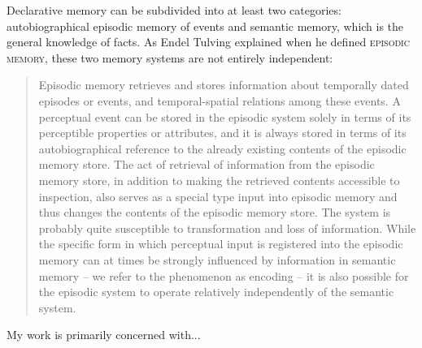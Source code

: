 Declarative memory can be subdivided into at least two categories: autobiographical episodic memory of events and semantic memory, which is the general knowledge of facts.
As Endel Tulving explained when he defined \textsc{episodic memory}, these two memory systems are not entirely independent:


\begin{quote}
Episodic memory retrieves and stores information about temporally dated episodes or events, and temporal-spatial relations among these events. A perceptual event can be stored in the episodic system solely in terms of its perceptible properties or attributes, and it is always stored in terms of its autobiographical reference to the already existing contents of the episodic memory store. The act of retrieval of information from the episodic memory store, in addition to making the retrieved contents accessible to inspection, also serves as a special type input into episodic memory and thus changes the contents of the episodic memory store. The system is probably quite susceptible to transformation and loss of information. While the specific form in which perceptual input is registered into the episodic memory can at times be strongly influenced by information in semantic memory -- we refer to the phenomenon as encoding -- it is also possible for the episodic system to operate relatively independently of the semantic system.
\end{quote}

My work is primarily concerned with...


